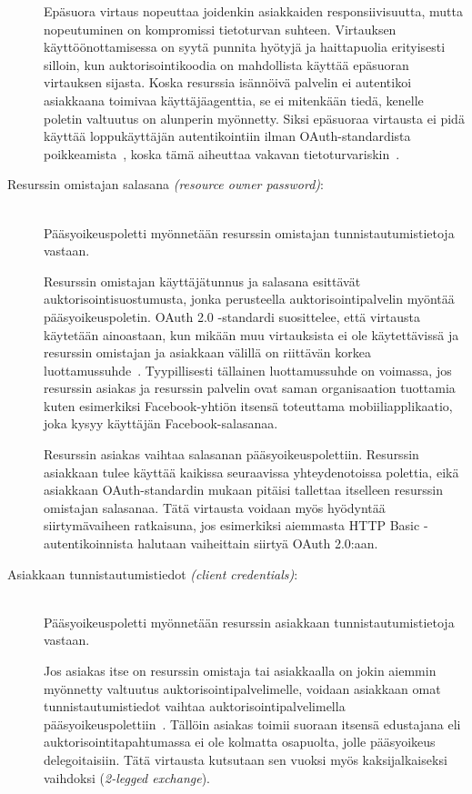 \documentclass[finnish,gradu]{tktltiki}
\begin{document}
\begin{description}
  Epäsuora virtaus nopeuttaa joidenkin asiakkaiden responsiivisuutta, mutta nopeutuminen on kompromissi tietoturvan suhteen. Virtauksen käyttöönottamisessa on syytä punnita hyötyjä ja haittapuolia erityisesti silloin, kun auktorisointikoodia on mahdollista käyttää epäsuoran virtauksen sijasta. Koska resurssia isännöivä palvelin ei autentikoi asiakkaana toimivaa käyttäjäagenttia, se ei mitenkään tiedä, kenelle poletin valtuutus on alunperin myönnetty. Siksi epäsuoraa virtausta ei pidä käyttää loppukäyttäjän autentikointiin ilman OAuth-standardista poikkeamista~\cite{facebook_oauth2_signed_request}, koska tämä aiheuttaa vakavan tietoturvariskin~\cite{bradley_oauth_authentication_problem_2012, bradley_oauth_implicit_flow_vulnerability_2012, sakimura_oauth_authentication_problem_2012}.


   \item[Resurssin omistajan salasana \emph{(resource owner password)}:] \hfill \\
   Pääsyoikeuspoletti myönnetään resurssin omistajan tunnistautumistietoja vastaan.

   Resurssin omistajan käyttäjätunnus ja salasana esittävät auktorisointisuostumusta, jonka perusteella auktorisointipalvelin myöntää pääsyoikeuspoletin. OAuth 2.0 -standardi suosittelee, että virtausta käytetään ainoastaan, kun mikään muu virtauksista ei ole käytettävissä ja resurssin omistajan ja asiakkaan välillä on riittävän korkea luottamussuhde~\cite{ietf_oauth2}. Tyypillisesti tällainen luottamussuhde on voimassa, jos resurssin asiakas ja resurssin palvelin ovat saman organisaation tuottamia kuten esimerkiksi Facebook-yhtiön itsensä toteuttama mobiiliapplikaatio, joka kysyy käyttäjän Facebook-salasanaa.

   Resurssin asiakas vaihtaa salasanan pääsyoikeuspolettiin. Resurssin asiakkaan tulee käyttää kaikissa seuraavissa yhteydenotoissa polettia, eikä asiakkaan OAuth-standardin mukaan pitäisi tallettaa itselleen resurssin omistajan salasanaa. Tätä virtausta voidaan myös hyödyntää siirtymävaiheen ratkaisuna, jos esimerkiksi aiemmasta HTTP Basic -autentikoinnista halutaan vaiheittain siirtyä OAuth 2.0:aan.

   \item[Asiakkaan tunnistautumistiedot \emph{(client credentials)}:] \hfill \\
   Pääsyoikeuspoletti myönnetään resurssin asiakkaan tunnistautumistietoja vastaan.

  Jos asiakas itse on resurssin omistaja tai asiakkaalla on jokin aiemmin myönnetty valtuutus auktorisointipalvelimelle, voidaan asiakkaan omat tunnistautumistiedot vaihtaa auktorisointipalvelimella pääsyoikeuspolettiin~\cite{ietf_oauth2}. Tällöin asiakas toimii suoraan itsensä edustajana eli auktorisointitapahtumassa ei ole kolmatta osapuolta, jolle pääsyoikeus delegoitaisiin. Tätä virtausta kutsutaan sen vuoksi myös kaksijalkaiseksi vaihdoksi (\emph{2-legged exchange}).

   \end{description}
\end{document}
